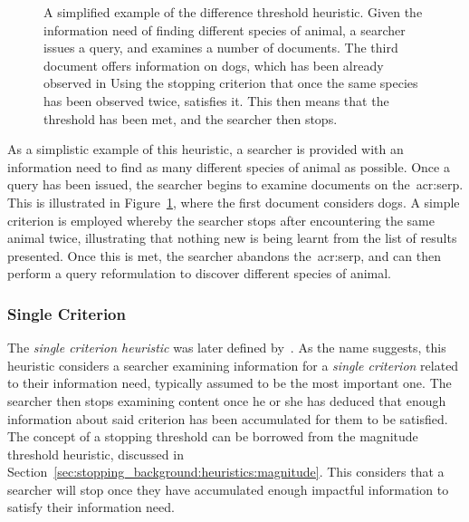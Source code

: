 \begin{figure}[t!]
    \centering
    \caption[Difference threshold heuristic]{A simplified example of the difference threshold heuristic. Given the information need of finding different species of animal, a searcher issues a query, and examines a number of documents. The third document offers information on dogs, which has been already observed in  Using the stopping criterion that once the same species has been observed twice,  satisfies it. This then means that the threshold has been met, and the searcher then stops.}
    \label{fig:difference_heuristic}
\end{figure}

As a simplistic example of this heuristic, a searcher is provided with an information need to find as many different species of animal as possible. Once a query has been issued, the searcher begins to examine documents on the~\gls{acr:serp}. This is illustrated in Figure~\ref{fig:difference_heuristic}, where the first document considers dogs. A simple criterion is employed whereby the searcher stops after encountering the same animal twice, illustrating that nothing new is being learnt from the list of results presented. Once this is met, the searcher abandons the~\gls{acr:serp}, and can then perform a query reformulation to discover different species of animal.

\subsubsection{Single Criterion}\label{sec:stopping_background:heuristics:single}
The \emph{single criterion heuristic} was later defined by~\cite{browne2005stopping_rules}. As the name suggests, this heuristic considers a searcher examining information for a \emph{single criterion} related to their information need, typically assumed to be the most important one. The searcher then stops examining content once he or she has deduced that enough information about said criterion has been accumulated for them to be satisfied. The concept of a stopping threshold can be borrowed from the magnitude threshold heuristic, discussed in Section~\ref{sec:stopping_background:heuristics:magnitude}. This considers that a searcher will stop once they have accumulated enough impactful information to satisfy their information need.

